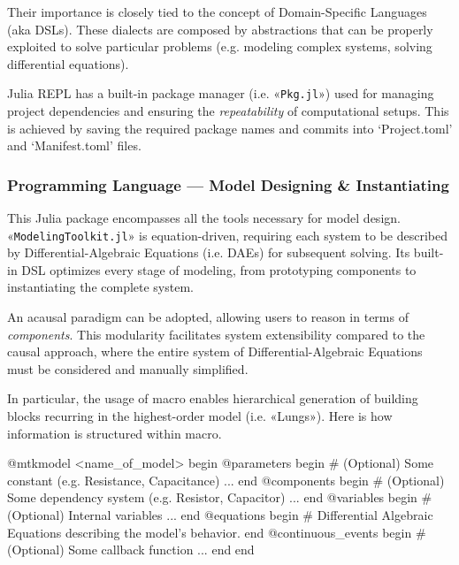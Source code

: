 Their importance is closely tied to the concept of Domain-Specific
Languages (aka DSLs).  These dialects are composed by abstractions
that can be properly exploited to solve particular problems
(e.g. modeling complex systems, solving differential equations).

Julia REPL has a built-in package manager (i.e. «\texttt{Pkg.jl}»)
used for managing project dependencies and ensuring the
\emph{repeatability} of computational setups.  This is achieved by
saving the required package names and commits into `Project.toml' and
`Manifest.toml' files.

\subsubsection{Programming Language --- Model Designing \& Instantiating}
\label{subsubsec:modelingtoolkit}

This Julia package encompasses all the tools necessary for model
design.  «\texttt{ModelingToolkit.jl}» is equation-driven, requiring
each system to be described by Differential-Algebraic Equations
(i.e. DAEs) for subsequent solving\cite{ma2021}. Its built-in DSL
optimizes every stage of modeling, from prototyping components to
instantiating the complete system.

An acausal paradigm can be adopted, allowing users to reason in terms
of \emph{components}\cite{mtkdocs2024}. This modularity facilitates
system extensibility compared to the causal approach, where the entire
system of Differential-Algebraic Equations must be considered and
manually simplified\cite{ma2024}.

In particular, the usage of  macro enables
hierarchical generation of building blocks recurring in the
highest-order model (i.e. «Lungs»).  Here is how information is
structured within  macro.

\begin{jllisting}[label=@mtkmodel, caption={\jlinl{@mtkmodel}: a macro for systems prototyping.}]
  @mtkmodel <name_of_model> begin
      @parameters begin
          # (Optional) Some constant (e.g. Resistance, Capacitance) ...
      end
      @components begin
          # (Optional) Some dependency system (e.g. Resistor, Capacitor) ...
      end
      @variables begin
          # (Optional) Internal variables ...
      end
      @equations begin
          # Differential Algebraic Equations describing the model's behavior.
      end
      @continuous_events begin
          # (Optional) Some callback function ...
      end
  end
\end{jllisting}


